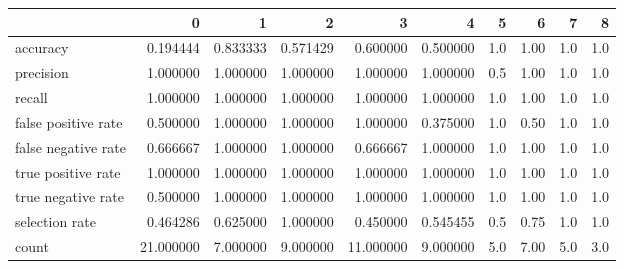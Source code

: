 \begin{tabular}{lrrrrrrrrr}
\toprule
{} &          0 &         1 &         2 &          3 &         4 &    5 &     6 &    7 &    8 \\
\midrule
accuracy            &   0.194444 &  0.833333 &  0.571429 &   0.600000 &  0.500000 &  1.0 &  1.00 &  1.0 &  1.0 \\
precision           &   1.000000 &  1.000000 &  1.000000 &   1.000000 &  1.000000 &  0.5 &  1.00 &  1.0 &  1.0 \\
recall              &   1.000000 &  1.000000 &  1.000000 &   1.000000 &  1.000000 &  1.0 &  1.00 &  1.0 &  1.0 \\
false positive rate &   0.500000 &  1.000000 &  1.000000 &   1.000000 &  0.375000 &  1.0 &  0.50 &  1.0 &  1.0 \\
false negative rate &   0.666667 &  1.000000 &  1.000000 &   0.666667 &  1.000000 &  1.0 &  1.00 &  1.0 &  1.0 \\
true positive rate  &   1.000000 &  1.000000 &  1.000000 &   1.000000 &  1.000000 &  1.0 &  1.00 &  1.0 &  1.0 \\
true negative rate  &   0.500000 &  1.000000 &  1.000000 &   1.000000 &  1.000000 &  1.0 &  1.00 &  1.0 &  1.0 \\
selection rate      &   0.464286 &  0.625000 &  1.000000 &   0.450000 &  0.545455 &  0.5 &  0.75 &  1.0 &  1.0 \\
count               &  21.000000 &  7.000000 &  9.000000 &  11.000000 &  9.000000 &  5.0 &  7.00 &  5.0 &  3.0 \\
\bottomrule
\end{tabular}
